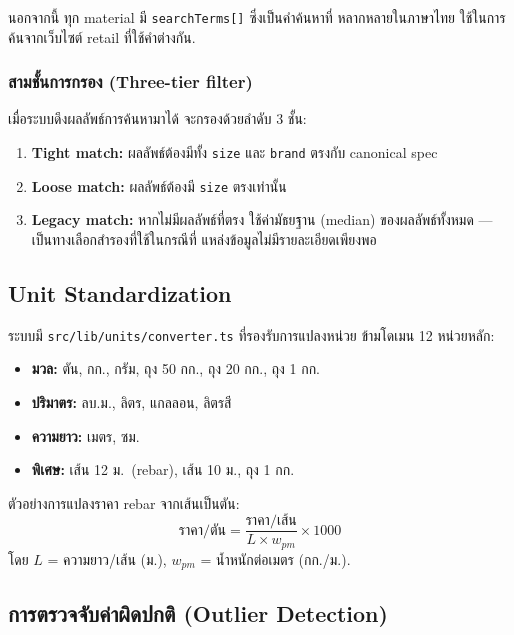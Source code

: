 นอกจากนี้ ทุก material มี \texttt{searchTerms[]} ซึ่งเป็นคำค้นหาที่
หลากหลายในภาษาไทย ใช้ในการค้นจากเว็บไซต์ retail ที่ใช้คำต่างกัน.

\subsubsection{สามชั้นการกรอง (Three-tier filter)}

เมื่อระบบดึงผลลัพธ์การค้นหามาได้ จะกรองด้วยลำดับ 3 ชั้น:

\begin{enumerate}[leftmargin=2em,itemsep=0.2em]
  \item \textbf{Tight match:} ผลลัพธ์ต้องมีทั้ง \texttt{size} และ
        \texttt{brand} ตรงกับ canonical spec
  \item \textbf{Loose match:} ผลลัพธ์ต้องมี \texttt{size} ตรงเท่านั้น
  \item \textbf{Legacy match:} หากไม่มีผลลัพธ์ที่ตรง ใช้ค่ามัธยฐาน
        (median) ของผลลัพธ์ทั้งหมด — เป็นทางเลือกสำรองที่ใช้ในกรณีที่
        แหล่งข้อมูลไม่มีรายละเอียดเพียงพอ
\end{enumerate}

\subsection{Unit Standardization}

ระบบมี \texttt{src/lib/units/converter.ts} ที่รองรับการแปลงหน่วย
ข้ามโดเมน 12 หน่วยหลัก:

\begin{itemize}[leftmargin=2em,itemsep=0.1em]
  \item \textbf{มวล:} ตัน, กก., กรัม, ถุง 50 กก., ถุง 20 กก.,
        ถุง 1 กก.
  \item \textbf{ปริมาตร:} ลบ.ม., ลิตร, แกลลอน, ลิตรสี
  \item \textbf{ความยาว:} เมตร, ซม.
  \item \textbf{พิเศษ:} เส้น 12 ม.\ (rebar), เส้น 10 ม., ถุง 1 กก.
\end{itemize}

ตัวอย่างการแปลงราคา rebar จากเส้นเป็นตัน:
\begin{equation}
\text{ราคา/ตัน} = \frac{\text{ราคา/เส้น}}{L \times w_{pm}} \times 1000
\end{equation}
โดย $L$ = ความยาว/เส้น (ม.), $w_{pm}$ = น้ำหนักต่อเมตร (กก./ม.).

\subsection{การตรวจจับค่าผิดปกติ (Outlier Detection)}

